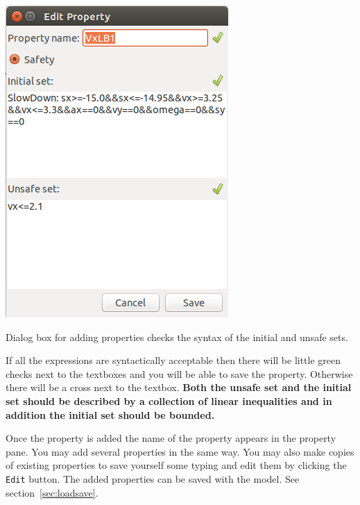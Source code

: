 \documentclass{tufte-book} %
\begin{document}
\begin{marginfigure}
\centerline{\includegraphics[width=\textwidth]{Images/property_dialog.png}}
 \caption{Dialog box for adding properties checks the syntax of the initial and unsafe sets.}
 \label{fig:property dialog}
\end{marginfigure}
%
If all the expressions are syntactically acceptable then there will be little green checks
next to the textboxes and you will be able to save the property. Otherwise there will be a cross next to the textbox.
{\bf Both the unsafe set and the initial set should be described by a collection of linear inequalities and in addition the initial set should be bounded.\/}

Once the property is added the name of the property appears in the property pane. 
You may add several properties in the same way. 
You may also make copies of existing properties to save yourself some typing and edit them by clicking the \texttt{Edit} button.
The added properties can be saved with the model. See section~\ref{sec:loadsave}.
\end{document}
